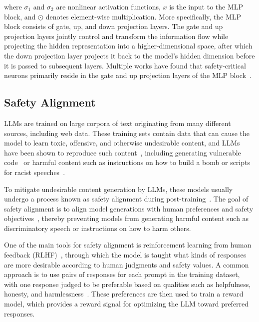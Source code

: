 where $\sigma_1$ and $\sigma_2$ are nonlinear activation functions, $x$ is the input to the MLP block, and $\odot$ denotes element-wise multiplication. More specifically, the MLP block consists of gate, up, and down projection layers. The gate and up projection layers jointly control and transform the information flow while projecting the hidden representation into a higher-dimensional space, after which the down projection layer projects it back to the model's hidden dimension before it is passed to subsequent layers. Multiple works have found that safety-critical neurons primarily reside in the gate and up projection layers of the MLP block~\cite{twinbreak, wu2026neurostrike}.

\subsection{Safety Alignment}
\label{subsec:background:safety_alignment}
LLMs are trained on large corpora of text originating from many different sources, including web data. These training sets contain data that can cause the model to learn toxic, offensive, and otherwise undesirable content, and LLMs have been shown to reproduce such content~\cite{gehman2020realtoxicityprompts}, including generating vulnerable code~\cite{pearce2022copilot} or harmful content such as instructions on how to build a bomb or scripts for racist speeches~\cite{twinbreak, wu2026neurostrike}.


To mitigate undesirable content generation by LLMs, these models usually undergo a process known as safety alignment during post-training~\cite{tulu3, ouyang2022rlhf, rafailov2023dpo}. The goal of safety alignment is to align model generations with human preferences and safety objectives~\cite{ouyang2022rlhf}, thereby preventing models from generating harmful content such as discriminatory speech or instructions on how to harm others.


One of the main tools for safety alignment is reinforcement learning from human feedback (RLHF)~\cite{ouyang2022rlhf}, through which the model is taught what kinds of responses are more desirable according to human judgments and safety values. A common approach is to use pairs of responses for each prompt in the training dataset, with one response judged to be preferable based on qualities such as helpfulness, honesty, and harmlessness~\cite{ouyang2022rlhf}. These preferences are then used to train a reward model, which provides a reward signal for optimizing the LLM toward preferred responses.


